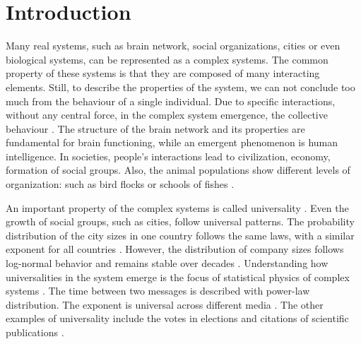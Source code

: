 \chapter{Introduction} %

Many real systems, such as brain network, social organizations, cities or even biological systems, can be represented as a complex systems. The common property of these systems is that they are composed of many interacting elements. Still, to describe the properties of the system, we can not conclude too much from the behaviour of a single individual. Due to specific interactions, without any central force, in the complex system emergence, the collective behaviour \cite{kwapien2012}. The structure of the brain network and its properties are fundamental for brain functioning, while an emergent phenomenon is human intelligence. In societies, people's interactions lead to civilization, economy, formation of social groups. Also, the animal populations show different levels of organization: such as bird flocks or schools of fishes \cite{thurner2018}.

An important property of the complex systems is called universality \cite{binney1992}. %
Even the growth of social groups, such as cities, follow universal patterns. The probability distribution of the city sizes in one country follows the same laws, with a similar exponent for all countries \cite{barthelemy2019, fazio2015pareto}. However, the distribution of company sizes follows log-normal behavior and remains stable over decades \cite{amaral1997scaling, stanley1996scaling}. Understanding how universalities in the system emerge is the focus of statistical physics of complex systems \cite{verbavatz2020}. The time between two messages is described with power-law distribution. The exponent is universal across different media \cite{garas2012emotional}. The other examples of universality include the votes in elections \cite{fortunato2007scaling, chatterjee2013} and citations of scientific publications \cite{radicchi2008}.


